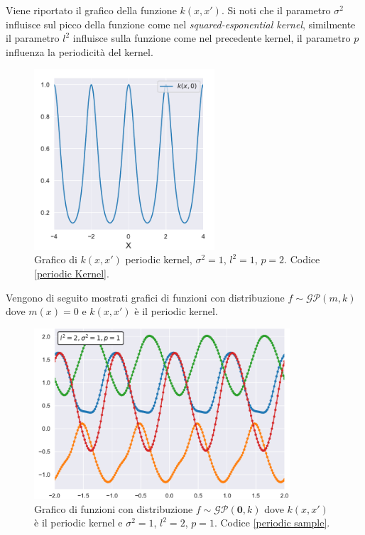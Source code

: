 Viene riportato il grafico della funzione $k(x,x')$. Si noti che il parametro $\sigma^2$ influisce sul picco della funzione come nel \textit{squared-esponential kernel}, similmente il parametro $l^2$ influisce sulla funzione come nel precedente kernel, il parametro $p$ influenza la periodicità del kernel. 


\begin{figure}[h]
    \centering
    \includegraphics[width=0.6\textwidth]{images/Gaussian process/Periodic kernel.pdf}
    \caption{Grafico di $k(x,x')$ periodic kernel, $\sigma^2=1$, $l^2=1$, $p=2$. Codice \ref{periodic Kernel}.}
    \label{periodic kernel}
\end{figure}




\newpage
Vengono di seguito mostrati grafici di funzioni con distribuzione $f\sim \mathcal{GP}(m,k)$ dove $m(x)=0$ e $k(x,x')$ è il periodic kernel.

\begin{figure}[h]
    \centering
    \includegraphics[width=0.85\textwidth]{images/Gaussian process/Periodic sample.pdf}
    \caption{Grafico di funzioni con distribuzione  $f\sim \mathcal{GP}(\bm{0},k)$ dove $k(x,x')$ è il periodic kernel e $\sigma^2=1$, $l^2=2$, $p=1$. Codice \ref{periodic sample}.}
    \label{3 sample periodic kerne zero mean}
\end{figure}


